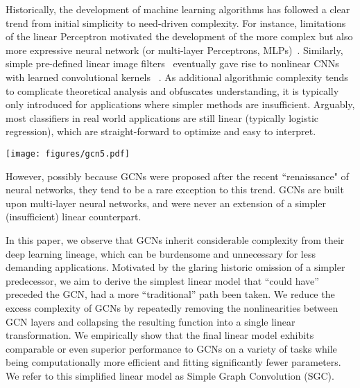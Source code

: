 \documentclass{article}
\newcommand{\Method}{Simple Graph Convolution}
\newcommand{\method}{SGC}
\begin{document}
Historically, the development of machine learning algorithms has followed a clear trend from initial simplicity to need-driven complexity. For instance, limitations of the linear Perceptron \cite{rosenblatt1958perceptron} motivated the development of the more complex but also more expressive neural network (or multi-layer Perceptrons, MLPs)~\cite{rosenblatt1961principles}. Similarly, simple pre-defined linear image filters~\cite{sobel19683x3,harris1988combined} eventually gave rise to nonlinear CNNs with learned convolutional kernels ~\cite{waibel1989phoneme,lecun1989backpropagation}. 
As additional algorithmic complexity tends to complicate theoretical analysis and obfuscates understanding, it is typically only introduced  for applications where simpler methods are insufficient.  Arguably, most classifiers in real world applications are still linear (typically logistic regression), which are straight-forward to optimize and easy to interpret. 



\begin{figure*}[h!]
    \centering
    \texttt{[image: figures/gcn5.pdf]}
    \caption{Schematic layout of a GCN v.s. a SGC. \textit{Top row:} The GCN  transforms the feature vectors repeatedly throughout  layers and then applies a linear classifier on the final representation. \textit{Bottom row:}  the \method{} reduces the entire procedure to a simple feature propagation step followed by standard logistic regression. }
    \label{fig:method}
\end{figure*}

However, possibly because GCNs were proposed after the recent ``renaissance" of neural networks, they tend to be a rare exception to this trend. GCNs are built upon multi-layer neural networks, and were never an extension of a simpler (insufficient) linear counterpart. 

In this paper, we observe that GCNs inherit considerable  complexity from their deep learning lineage, which can be burdensome and unnecessary for less demanding applications. Motivated by the glaring historic omission of a simpler predecessor, we aim to derive the simplest linear model that ``could have'' preceded the GCN, had a more ``traditional'' path been taken. We reduce the excess complexity of GCNs by repeatedly removing the nonlinearities between GCN layers and collapsing the resulting function into a single linear transformation. We empirically show that the final linear model exhibits comparable or even superior performance to GCNs on a variety of tasks while being computationally more efficient and fitting significantly fewer parameters. We refer to this simplified linear model as \Method{} (\method{}). 
\end{document}
